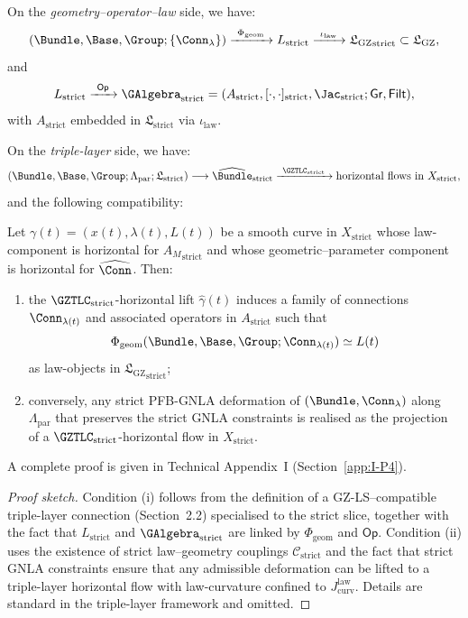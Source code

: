 \documentclass[11pt]{book}
\theoremstyle{plain}
\theoremstyle{definition}
\newcommand{\GZLS}{\ensuremath{\mathfrak{L}_{\mathrm{GZ}}}}       \newcommand{\GZLT}{\ensuremath{M_{!w}}}                           \newcommand{\GZLOC}{\ensuremath{A_M}}                             \newcommand{\GZLCurv}{\ensuremath{\mathcal{F}_{\mathrm{law}}}}
\begin{document}
On the \emph{geometry–operator–law} side, we have:
\[
   (\Bundle,\Base,\Group;\{\Conn_\lambda\})
   \xrightarrow{\ \Phi_{\mathrm{geom}}\ }
   L_{\mathrm{strict}}
   \xrightarrow{\ \iota_{\mathrm{law}}\ }
   {\GZLS}_{\mathrm{strict}}\subset\GZLS,
\]
and
\[
   L_{\mathrm{strict}}
   \xrightarrow{\ \mathsf{Op}\ }
   \GAlgebra_{\mathrm{strict}}
   =
   (A_{\mathrm{strict}},[\cdot,\cdot]_{\mathrm{strict}},
    \Jac_{\mathrm{strict}};\mathsf{Gr},\mathsf{Filt}),
\]
with $A_{\mathrm{strict}}$ embedded in
$\mathfrak{L}_{\mathrm{strict}}$ via $\iota_{\mathrm{law}}$.

On the \emph{triple-layer} side, we have:
\[
   (\Bundle,\Base,\Group;\Lambda_{\mathrm{par}};\mathfrak{L}_{\mathrm{strict}})
   \longrightarrow
   \widehat{\Bundle}_{\mathrm{strict}}
   \xrightarrow{\ \GZTLC_{\mathrm{strict}}\ }
   \text{horizontal flows in }X_{\mathrm{strict}},
\]
and the following compatibility:

\begin{proposition}
Let $\gamma(t)=(x(t),\lambda(t),L(t))$ be a smooth curve in
  $X_{\mathrm{strict}}$ whose law-component is horizontal for
  ${\GZLOC}_{\mathrm{strict}}$ and whose geometric–parameter component
  is horizontal for $\widehat{\Conn}$. Then:
  \begin{enumerate}[label=\roman*)]
    \item the $\GZTLC_{\mathrm{strict}}$-horizontal lift
          $\widehat{\gamma}(t)$ induces a family of connections
          $\Conn_{\lambda(t)}$ and associated operators in
          $A_{\mathrm{strict}}$ such that
          \[
             \Phi_{\mathrm{geom}}
               (\Bundle,\Base,\Group;\Conn_{\lambda(t)})
             \simeq
             L(t)
          \]
          as law-objects in ${\GZLS}_{\mathrm{strict}}$;
    \item conversely, any strict PFB-GNLA deformation of
          $(\Bundle,\Conn_\lambda)$ along $\Lambda_{\mathrm{par}}$
          that preserves the strict GNLA constraints is realised as the
          projection of a $\GZTLC_{\mathrm{strict}}$-horizontal flow
          in $X_{\mathrm{strict}}$.
  \end{enumerate}
  A complete proof is given in Technical Appendix~I
  (Section~\ref{app:I-P4}).
\end{proposition}

\begin{proof}[Proof sketch]
Condition (i) follows from the definition of a GZ-LS–compatible
  triple-layer connection (Section~2.2) specialised to the strict
  slice, together with the fact that $L_{\mathrm{strict}}$ and
  $\GAlgebra_{\mathrm{strict}}$ are linked by
  $\Phi_{\mathrm{geom}}$ and $\mathsf{Op}$. Condition (ii) uses the
  existence of strict law–geometry couplings $\mathcal{C}_{\mathrm{strict}}$
  and the fact that strict GNLA constraints ensure that any admissible
  deformation can be lifted to a triple-layer horizontal flow with
  law-curvature confined to $J_{\mathrm{curv}}^{\mathrm{law}}$. Details
  are standard in the triple-layer framework and omitted.
\end{proof}
\end{document}
